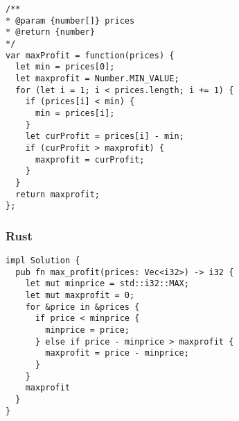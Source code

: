 \begin{verbatim}
/**
* @param {number[]} prices
* @return {number}
*/
var maxProfit = function(prices) {
  let min = prices[0];
  let maxprofit = Number.MIN_VALUE;
  for (let i = 1; i < prices.length; i += 1) {
    if (prices[i] < min) {
      min = prices[i];
    }
    let curProfit = prices[i] - min;
    if (curProfit > maxprofit) {
      maxprofit = curProfit;
    }
  }
  return maxprofit;
};
\end{verbatim}

\subsubsection{Rust}

\begin{verbatim}
impl Solution {
  pub fn max_profit(prices: Vec<i32>) -> i32 {
    let mut minprice = std::i32::MAX;
    let mut maxprofit = 0;
    for &price in &prices {
      if price < minprice {
        minprice = price;
      } else if price - minprice > maxprofit {
        maxprofit = price - minprice;
      }
    }
    maxprofit
  }
}
\end{verbatim}
